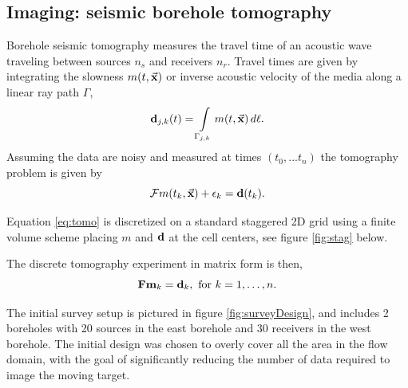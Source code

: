 \documentclass[11pt]{article}
\newcommand{\bfF}	{{\bf{F}}}
\newcommand{\bfd}	{{\bf{d}}}
\newcommand{\bfm}	{{\bf{m}}}
\newcommand {\vx}    {\vec {\bf x}}
\newcommand{\CF} 	 {\mathcal{F}}    %
\begin{document}
\subsection{Imaging: seismic borehole tomography}
 Borehole seismic tomography  measures the travel time of an acoustic wave traveling between sources $n_s$ and receivers $n_r$. Travel times are given by integrating the slowness  $m(t,\vx)$  or inverse acoustic velocity of the media  along a linear ray path $\Gamma$,
\begin{equation*}\label{eq:tomo}
\bfd_{j,k}(t) =  \int\limits_{\Gamma_{j,k}} m(t,\vx)\, d\ell.
\end{equation*}
 Assuming the data are noisy and measured at times $(t_0,...t_n)$ the tomography problem is given by 
 \begin{equation*}
 \CF m(t_{k},\vx) + \epsilon_{k}  = \bfd(t_{k}).\\
\end{equation*}

Equation \eqref{eq:tomo} is discretized on a standard staggered 2D grid using a finite volume scheme placing $m$ and $\bfd$ at the cell centers, see figure \ref{fig:stag} below. 

The discrete tomography experiment in matrix form is then,
\begin{equation}
 	\bfF{\bfm_k} = \bfd_k, \text{ for } k=1,\ldots,n.
\end{equation}

The initial survey setup is pictured in figure \ref{fig:surveyDesign}, and includes 2 boreholes with 20 sources in the east borehole and  30 receivers in the west borehole. The initial design was chosen to overly cover all the area in the flow domain, with the goal of significantly reducing the number of data required to image the moving target. 
\end{document}
